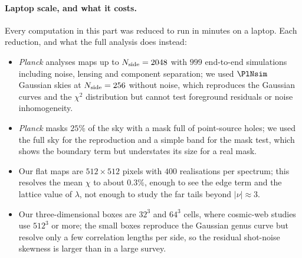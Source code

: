 \paragraph{Laptop scale, and what it costs.} Every computation in this part was reduced to run in minutes on a
laptop. Each reduction, and what the full analysis does instead:
\begin{itemize}[itemsep=1pt,leftmargin=1.2em]
  \item \textit{Planck} analyses maps up to $N_{\rm side}=2048$ with $999$ end-to-end simulations including noise,
        lensing and component separation; we used $\PlNsim$ Gaussian skies at $N_{\rm side}=256$ without noise, which
        reproduces the Gaussian curves and the $\chi^2$ distribution but cannot test foreground residuals or noise
        inhomogeneity.
  \item \textit{Planck} masks $25\%$ of the sky with a mask full of point-source holes; we used the full sky for the
        reproduction and a simple band for the mask test, which shows the boundary term but understates its size
        for a real mask.
  \item Our flat maps are $512\times512$ pixels with $400$ realisations per spectrum; this resolves the mean $\chi$
        to about $0.3\%$, enough to see the edge term and the lattice value of $\lambda$, not enough to study the
        far tails beyond $|\nu|\approx3$.
  \item Our three-dimensional boxes are $32^3$ and $64^3$ cells, where cosmic-web studies use $512^3$ or more; the
        small boxes reproduce the Gaussian genus curve but resolve only a few correlation lengths per side, so
        the residual shot-noise skewness is larger than in a large survey.
\end{itemize}

